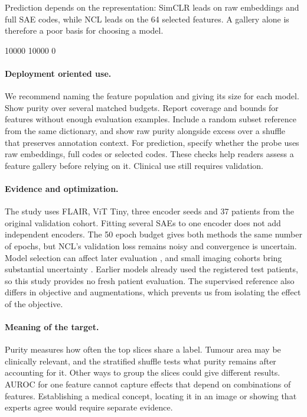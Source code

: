 \documentclass[letterpaper]{article}
\begin{document}
\begingroup{}
Prediction depends on the representation: SimCLR leads on raw embeddings and full SAE codes, while NCL leads on the 64 selected features. A gallery alone is therefore a poor basis for choosing a model.
\par\endgroup

\begingroup{} 10000 10000 0\relax
\paragraph{Deployment oriented use.}
We recommend naming the feature population and giving its size for each model. Show purity over several matched budgets. Report coverage and bounds for features without enough evaluation examples. Include a random subset reference from the same dictionary, and show raw purity alongside excess over a shuffle that preserves annotation context. For prediction, specify whether the probe uses raw embeddings, full codes or selected codes. These checks help readers assess a feature gallery before relying on it. Clinical use still requires validation.
\par\endgroup

\paragraph{Evidence and optimization.}
The study uses FLAIR, ViT Tiny, three encoder seeds and 37 patients from the original validation cohort. Fitting several SAEs to one encoder does not add independent encoders. The 50 epoch budget gives both methods the same number of epochs, but NCL's validation loss remains noisy and convergence is uncertain. Model selection can affect later evaluation \cite{cawley2010selection}, and small imaging cohorts bring substantial uncertainty \cite{varoquaux2018crossvalidation}. Earlier models already used the registered test patients, so this study provides no fresh patient evaluation. The supervised reference also differs in objective and augmentations, which prevents us from isolating the effect of the objective.

\paragraph{Meaning of the target.}
Purity measures how often the top slices share a label. Tumour area may be clinically relevant, and the stratified shuffle tests what purity remains after accounting for it. Other ways to group the slices could give different results. AUROC for one feature cannot capture effects that depend on combinations of features. Establishing a medical concept, locating it in an image or showing that experts agree would require separate evidence.
\end{document}
